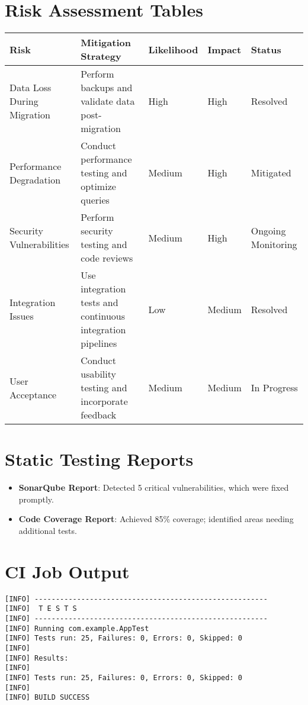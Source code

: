 \documentclass[12pt,a4paper]{report}
\begin{document}
\section{Risk Assessment Tables}
\begin{landscape}
\begin{longtable}{p{4cm} p{6cm} p{2cm} p{2cm} p{2cm}}
\toprule
\textbf{Risk} & \textbf{Mitigation Strategy} & \textbf{Likelihood} & \textbf{Impact} & \textbf{Status} \\
\midrule
Data Loss During Migration & Perform backups and validate data post-migration & High & High & Resolved \\
Performance Degradation & Conduct performance testing and optimize queries & Medium & High & Mitigated \\
Security Vulnerabilities & Perform security testing and code reviews & Medium & High & Ongoing Monitoring \\
Integration Issues & Use integration tests and continuous integration pipelines & Low & Medium & Resolved \\
User Acceptance & Conduct usability testing and incorporate feedback & Medium & Medium & In Progress \\
\bottomrule
\end{longtable}
\end{landscape}

\section{Static Testing Reports}
\begin{itemize}
    \item \textbf{SonarQube Report}: Detected 5 critical vulnerabilities, which were fixed promptly.
    \item \textbf{Code Coverage Report}: Achieved 85\% coverage; identified areas needing additional tests.
\end{itemize}

\section{CI Job Output}
\begin{verbatim}
[INFO] -------------------------------------------------------
[INFO]  T E S T S
[INFO] -------------------------------------------------------
[INFO] Running com.example.AppTest
[INFO] Tests run: 25, Failures: 0, Errors: 0, Skipped: 0
[INFO] 
[INFO] Results:
[INFO] 
[INFO] Tests run: 25, Failures: 0, Errors: 0, Skipped: 0
[INFO] 
[INFO] BUILD SUCCESS
\end{verbatim}
\end{document}
